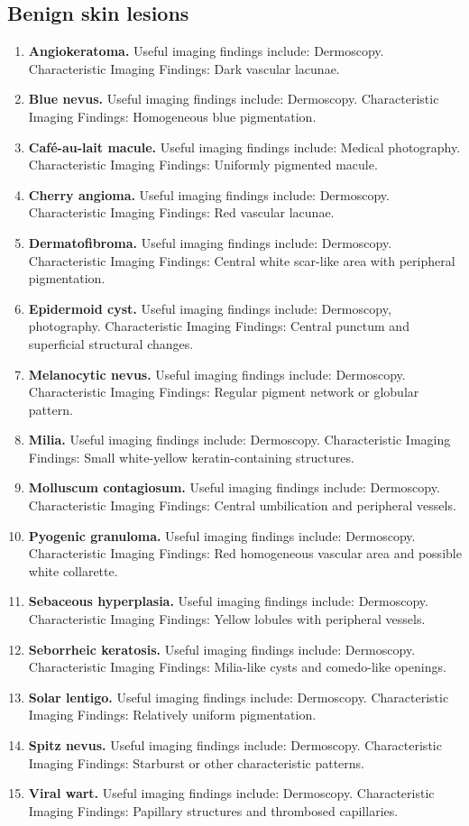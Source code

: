 \subsection{Benign skin lesions}
\begin{enumerate}[leftmargin=*,itemsep=0.45em,topsep=0.4em]
\item \textbf{Angiokeratoma.} Useful imaging findings include: Dermoscopy. Characteristic Imaging Findings: Dark vascular lacunae.
\item \textbf{Blue nevus.} Useful imaging findings include: Dermoscopy. Characteristic Imaging Findings: Homogeneous blue pigmentation.
\item \textbf{Café-au-lait macule.} Useful imaging findings include: Medical photography. Characteristic Imaging Findings: Uniformly pigmented macule.
\item \textbf{Cherry angioma.} Useful imaging findings include: Dermoscopy. Characteristic Imaging Findings: Red vascular lacunae.
\item \textbf{Dermatofibroma.} Useful imaging findings include: Dermoscopy. Characteristic Imaging Findings: Central white scar-like area with peripheral pigmentation.
\item \textbf{Epidermoid cyst.} Useful imaging findings include: Dermoscopy, photography. Characteristic Imaging Findings: Central punctum and superficial structural changes.
\item \textbf{Melanocytic nevus.} Useful imaging findings include: Dermoscopy. Characteristic Imaging Findings: Regular pigment network or globular pattern.
\item \textbf{Milia.} Useful imaging findings include: Dermoscopy. Characteristic Imaging Findings: Small white-yellow keratin-containing structures.
\item \textbf{Molluscum contagiosum.} Useful imaging findings include: Dermoscopy. Characteristic Imaging Findings: Central umbilication and peripheral vessels.
\item \textbf{Pyogenic granuloma.} Useful imaging findings include: Dermoscopy. Characteristic Imaging Findings: Red homogeneous vascular area and possible white collarette.
\item \textbf{Sebaceous hyperplasia.} Useful imaging findings include: Dermoscopy. Characteristic Imaging Findings: Yellow lobules with peripheral vessels.
\item \textbf{Seborrheic keratosis.} Useful imaging findings include: Dermoscopy. Characteristic Imaging Findings: Milia-like cysts and comedo-like openings.
\item \textbf{Solar lentigo.} Useful imaging findings include: Dermoscopy. Characteristic Imaging Findings: Relatively uniform pigmentation.
\item \textbf{Spitz nevus.} Useful imaging findings include: Dermoscopy. Characteristic Imaging Findings: Starburst or other characteristic patterns.
\item \textbf{Viral wart.} Useful imaging findings include: Dermoscopy. Characteristic Imaging Findings: Papillary structures and thrombosed capillaries.
\end{enumerate}

